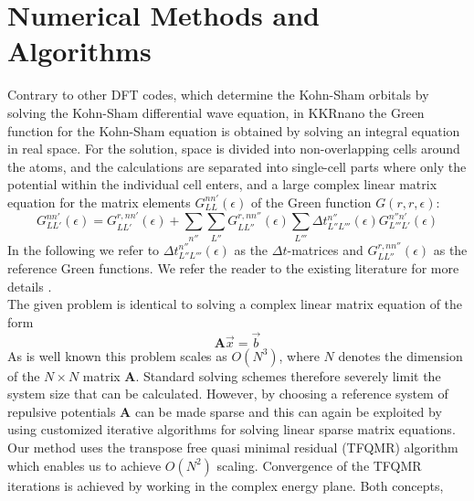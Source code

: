 \documentclass [a4paper, 12pt]{article}
\newcommand{\matr}[1]{\bm{#1}}
\begin{document}
\section{Numerical Methods and Algorithms} 
 

Contrary to other DFT codes, which determine the Kohn-Sham orbitals by solving
the Kohn-Sham differential wave equation, in KKRnano the Green function for the Kohn-Sham
equation is obtained by solving an integral equation in real space. For the solution, space is divided
into non-overlapping cells around the atoms, and the calculations are separated into single-cell parts
where only the potential within the individual cell enters, and a large complex linear matrix equation for 
the matrix elements $G_{LL}^{nn'} (\epsilon)$ of the Green function $G(r, r , \epsilon)$:
\begin{equation}
	G_{LL'}^{nn'} (\epsilon) = G_{LL'}^{r,nn'} (\epsilon) + \sum_{n''} \sum_{L''}
	G_{LL''}^{r,nn''} (\epsilon) \sum_{L'''} \Delta t_{L'' L'''}^{n''} (\epsilon)
	G_{L'''L'}^{n''n'} (\epsilon)
	\label{eq:dyson_eq}
\end{equation}
In the following we refer to $\Delta t_{L'' L'''}^{n''} (\epsilon)$ as the $\Delta t$-matrices and
$G_{LL''}^{r,nn''} (\epsilon)$ as the reference Green functions. We refer the reader to the existing
literature for more details \cite{zeller_towards_2008}.
\\
The given problem is identical to solving a complex linear matrix equation of the form
\begin{equation}
	\matr{A} \vec{x} = \vec{b}
\end{equation}
As is well known this problem scales as $O(N^3)$, where $N$ denotes the dimension of the $N \times N$
matrix $\matr{A}$. Standard solving schemes therefore severely limit the system size that can
be calculated.
However, by choosing a reference system of repulsive potentials
$\matr{A}$ can be made sparse and this can again be exploited
by using customized iterative algorithms for solving linear sparse matrix equations.
Our method uses the transpose free quasi minimal residual (TFQMR) algorithm \cite{freund_qmr:_1991}
which enables us to achieve $O(N^2)$ scaling. 
Convergence of the TFQMR iterations is achieved by working in the complex energy plane. Both concepts,
\end{document}

